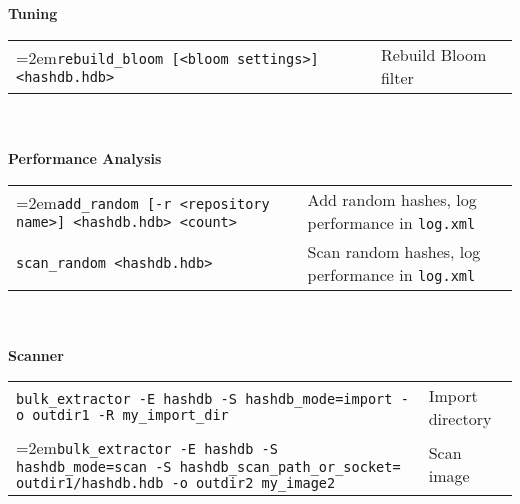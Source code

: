 \begin{small}
\begin{footnotesize}
\begin{tabular}{p{3.6 in} p{3.0 in}}
\end{tabular}
\\
\\
\textbf{Tuning}\\
\begin{tabular}{p{3.6 in} p{3.0 in}}
\hangindent=2em\texttt{rebuild\_bloom [<bloom settings>] <hashdb.hdb>} & Rebuild Bloom filter \\
\end{tabular}
\\
\\
\textbf{Performance Analysis}\\
\begin{tabular}{p{3.6 in} p{4 in}}
\hangindent=2em\texttt{add\_random [-r <repository name>] <hashdb.hdb> <count>} & Add random hashes, log performance in \texttt{log.xml}\\
\texttt{scan\_random <hashdb.hdb>} & Scan random hashes, log performance in \texttt{log.xml}\\
\end{tabular}
\\
\\
\textbf{\bulk Scanner}\\
\begin{tabular}{p{5.6 in} p{2 in}}
\texttt{bulk\_extractor -E hashdb -S hashdb\_mode=import -o outdir1 -R my\_import\_dir} & Import directory\\
\hangindent=2em\texttt{bulk\_extractor -E hashdb -S hashdb\_mode=scan -S hashdb\_scan\_path\_or\_socket= outdir1/hashdb.hdb -o outdir2 my\_image2} & Scan image\\
\end{tabular}
\end{footnotesize}
\end{small}

